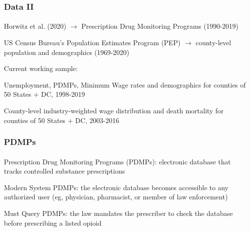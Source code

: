 \begin{frame}

    \frametitle{Data II} %
    \framesubtitle{}  %
    \rmfamily %

    \begin{wideitemize}
        \item \textcolor{fgre}{Horwitz et al. (2020)} \(\to\) Prescription Drug Monitoring Programs (1990-2019)
        \item \textcolor{fgre}{US Census Bureau's Population Estimates Program (PEP)} \(\to\) county-level population and demographics (1969-2020)
    \end{wideitemize}

    \vspace{9pt}
    Current working sample:
    \vspace{9pt}
    
    \begin{wideitemize}
        \item Unemployment, PDMPs, Minimum Wage rates and demographics for counties of 50 States + DC, 1998-2019
        \item County-level industry-weighted wage distribution and death mortality for counties of 50 States + DC, 2003-2016
    \end{wideitemize}

\end{frame}


\begin{frame}

    \frametitle{PDMPs} %
    \framesubtitle{}  %
    \rmfamily %
    
    Prescription Drug Monitoring Programs (\textcolor{fblu}{PDMPs}): electronic database that tracks controlled substance prescriptions
    \vspace{9pt}

    \begin{wideenumerate}
        \item \textcolor{fblu}{Modern System PDMPs}: the electronic database becomes accessible to any authorized user (eg, physician, pharmacist, or member of law enforcement)
        \item \textcolor{fblu}{Must Query PDMPs}: the law mandates the prescriber to check the database before prescribing a listed opioid
    \end{wideenumerate}

    

\end{frame}